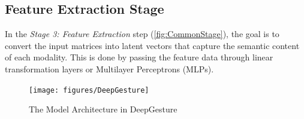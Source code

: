 \subsection{Feature Extraction Stage}
\label{subsec:feature_extraction}

In the \textit{Stage 3: Feature Extraction} step (\autoref{fig:CommonStage}), the goal is to convert the input matrices into latent vectors that capture the semantic content of each modality. This is done by passing the feature data through linear transformation layers or Multilayer Perceptrons (MLPs).


\begin{figure}[t]
	\centering
	\texttt{[image: figures/DeepGesture]}
	\caption{The Model Architecture in DeepGesture}
	\label{fig:DeepGesture}
\end{figure}



